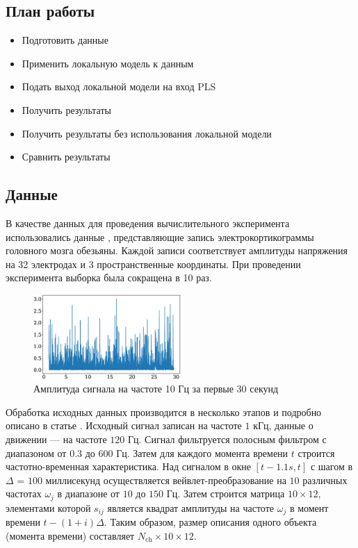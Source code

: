 \documentclass[12pt, twoside]{article}
\begin{document}
\subsection{План работы}
\begin{itemize}
\item Подготовить данные
\item Применить локальную модель к данным
\item Подать выход локальной модели на вход PLS
\item Получить результаты
\item Получить результаты без использования локальной модели 
\item Сравнить результаты
\end{itemize}
\subsection{Данные}
В качестве данных для проведения вычислительного эксперимента использовались данные \cite{chao2010long}, представляющие запись электрокортикограммы головного мозга обезьяны. Каждой записи соответствует амплитуды напряжения на 32 электродах и 3 пространственные координаты.
При проведении эксперимента выборка была сокращена в 10 раз.

\begin{figure}[]
	\centering
	\includegraphics[width=0.5\textwidth]{0freq.eps}
	\caption{Амплитуда сигнала на частоте 10 Гц за первые 30 секунд}
\end{figure}
Обработка исходных данных производится в несколько этапов и подробно описано в статье \cite{zhao2010ecog}. Исходный сигнал записан на частоте $1$ кГц, данные о движении — на частоте $120 $ Гц. Сигнал фильтруется полосным фильтром с диапазоном от $0.3$ до $600 $ Гц. Затем для каждого момента времени $t$ строится частотно-временная
характеристика. Над сигналом в окне $[t - 1.1s, t]$ с шагом в $\Delta$ = $100$ миллисекунд осуществляется вейвлет-преобразование на $10$ различных частотах $\omega_j$ в диапазоне от $10$ до $150$ Гц. Затем строится матрица \mbox{$10 \times 12$}, элементами которой $s_{ij}$ является квадрат амплитуды на частоте $\omega_j$ в момент времени \mbox{$t - (1 + i)\Delta$}. Таким образом, размер описания одного объекта (момента времени) составляет $N_\text{ch} \times 10 \times 12$.
\end{document}
